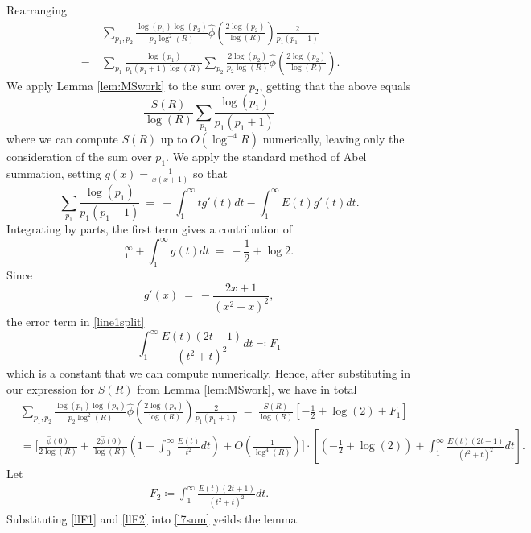 \documentclass[11pt, reqno]{amsart}
\makeatletter
\renewenvironment{proof}[1][\proofname]{\par
  \vspace{-.7\topsep}%
  \pushQED{\qed}%
  \normalfont
  \topsep0pt \partopsep0pt %
  \trivlist
  \item[\hskip\labelsep
        \itshape
    #1\@addpunct{.}]\ignorespaces
}{%
  \popQED\endtrivlist\@endpefalse
  \addvspace{6pt plus 6pt} %
}
\theoremstyle{definition}
\theoremstyle{remark}
\numberwithin{equation}{section}
\renewcommand{\hat}{\widehat}
\makeatother
\begin{document}
\begin{proof}
    Rearranging
    \begin{equation}
    \begin{aligned}
        &\sum_{p_1,p_2}\frac{\log(p_1)\log(p_2)}{p_2\log^2(R)}\hat\phi\left(\frac{2\log(p_2)}{\log(R)}\right)\frac{2}{p_1(p_1+1)}\\
        \ = \ &\sum_{p_1} \frac{\log(p_1)}{p_1(p_1+1)\log(R)}
            \sum_{p_2}\frac{2\log(p_2)}{p_2\log(R)}\hat\phi\left(\frac{2\log(p_2)}{\log(R)}\right).
    \end{aligned}
    \end{equation}
We apply Lemma \ref{lem:MSwork} to the sum over $p_2$, getting that the above equals
\begin{equation}
    \frac{S(R)}{\log(R)}\sum_{p_1} \frac{\log(p_1)}{p_1(p_1+1)}
\end{equation}
where we can compute $S(R)$ up to $O(\log^{-4}R)$ numerically, leaving only the consideration of the sum over $p_1.$ We apply the standard method of Abel summation, setting $g(x)=\frac{1}{x(x+1)}$ so that
\begin{equation}\label{line1split}
    \sum_{p_1}\frac{\log(p_1)}{p_1(p_1+1)}\ =\ -\int_1^\infty tg'(t)dt -\int_1^\infty E(t)g'(t)dt.
\end{equation}
Integrating by parts, the first term gives a contribution of
\begin{equation}
    [-tg(t)]_1^\infty+\int_1^\infty g(t)dt \ = \ -\frac{1}{2}+\log 2.
\end{equation}
Since
\begin{equation}
    g'(x) \ = \ -\frac{2x+1}{(x^2+x)^2},
\end{equation}
the error term in \eqref{line1split}
\begin{equation}
    \int_1^\infty \frac{E(t)(2t+1)}{(t^2+t)^2}dt \eqqcolon F_1 \label{llF1}
\end{equation}
which is a constant that we can compute numerically. Hence, after substituting in our expression for $S(R)$ from Lemma \ref{lem:MSwork}, we have in total
\begin{equation}
\begin{aligned}
    &\sum_{p_1,p_2}\frac{\log(p_1)\log(p_2)}{p_2\log^2(R)}\hat\phi\left(\frac{2\log(p_2)}{\log(R)}\right)\frac{2}{p_1(p_1+1)} \ = \ \frac{S(R)}{\log(R)}\left[-\frac{1}{2}+\log(2)+F_1\right]\\
    &=\bigg[\frac{\hat\phi(0)}{2\log(R)}+\frac{2\hat\phi(0)}{\log(R)}\left(1+\int_0^\infty\frac{E(t)}{t^2}dt\right)+O\left(\frac{1}{\log^4(R)}\right)\bigg]
    \cdot \left[\left(-\frac{1}{2}+\log(2)\right)+\int_1^\infty \frac{E(t)(2t+1)}{(t^2+t)^2}dt \right]. \label{l7sum}
\end{aligned}
\end{equation}
Let 
\begin{align}
    F_2\coloneqq \int_1^\infty \frac{E(t)(2t+1)}{(t^2+t)^2}dt. \label{llF2}
\end{align}
Substituting \eqref{llF1} and \eqref{llF2} into  \eqref{l7sum} yeilds the lemma.
\end{proof}
\end{document}
